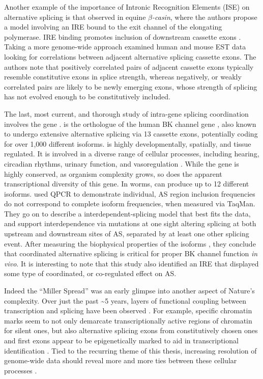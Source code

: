    Another example of the importance of Intronic Recognition Elements (ISE) on alternative splicing is that observed in equine \textit{$\beta$-casin}, where the authors propose a model involving an IRE bound to the exit channel of the elongating polymerase. IRE binding promotes inclusion of downstream cassette exons \citep{Lenasi2006}. Taking a more genome-wide approach \citet{Peng2008} examined human and mouse EST data looking for correlations between adjacent alternative splicing cassette exons. The authors note that positively correlated pairs of adjacent cassette exons typically resemble constitutive exons in splice strength, whereas negatively, or weakly correlated pairs are likely to be newly emerging exons, whose strength of splicing has not evolved enough to be constitutively included.

    The last, most current, and thorough study of intra-gene splicing coordination involves the \worms{} gene \slo{} \citep{Glauser2011, Johnson2011}. \slo{} is the \worms{} orthologue of the human BK channel gene \kcnma{}, also known to undergo extensive alternative splicing \citep{Nilsen2010} via 13 cassette exons, potentially coding for over 1,000 different isoforms. \kcnma{} is highly developmentally, spatially, and tissue regulated. It is involved in a diverse range of cellular processes, including hearing, circadian rhythms, urinary function, and vasoregulation \citep{Fodor2009a}. While the gene is highly conserved, as organism complexity grows, so does the apparent transcriptional diversity of this gene. In worms, \slo{} can produce up to 12 different isoforms. \citet{Glauser2011} used QPCR to demonstrate individual, AS region inclusion frequencies do not correspond to complete isoform frequencies, when measured via TaqMan. They go on to describe a interdependent-splicing model that best fits the data, and support interdependence via mutations at one sight altering splicing at both upstream and downstream sites of AS, separated by at least one other splicing event. After measuring the biophysical properties of the isoforms \citep{Johnson2011}, they conclude that coordinated alternative splicing is critical for proper BK channel function \textit{in vivo}. It is interesting to note that this study also identified an IRE that displayed some type of coordinated, or co-regulated effect on AS.

    Indeed the ``Miller Spread'' was an early glimpse into another aspect of Nature's complexity. Over just the past \textasciitilde5 years, layers of functional coupling between transcription and splicing have been observed \citep{Merkhofer2014}. For example, specific chromatin marks seem to not only demarcate transcriptionally active regions of chromatin for silent ones, but also alternative splicing exons from constitutively chosen ones \citep{Kolasinska-Zwierz2009} and first exons appear to be epigenetically marked to aid in transcriptional identification \citep{Bieberstein2012}. Tied to the recurring theme of this thesis, increasing resolution of genome-wide data should reveal more and more ties between these cellular processes \citep{Schwartz2010,Luco2011a,Brown2012}.


